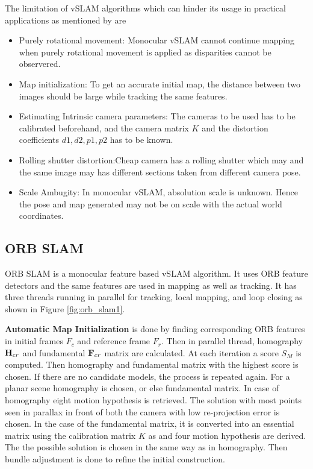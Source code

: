The limitation of vSLAM algorithms which can hinder its usage in practical applications as mentioned by  are

\begin{itemize}
	\item Purely rotational movement: Monocular vSLAM cannot continue mapping when purely rotational movement is applied as disparities cannot be observered.
	\item Map initialization: To get an accurate initial map, the distance between two images should be large while tracking the same features. 
	\item Estimating Intrinsic camera parameters: The cameras to be used has to be calibrated beforehand, and the  camera matrix $K$ and the distortion coefficients $d1, d2, p1, p2$ has to be known.
	\item Rolling shutter distortion:Cheap camera has a rolling shutter which may and the same image may has different sections taken from different camera pose.
	\item Scale Ambugity: In monocular vSLAM, absolution scale is unknown. Hence the pose and map generated may not be on scale with the actual world coordinates.
\end{itemize}




\subsection{ORB SLAM}

ORB SLAM \cite{7219438} is a monocular feature based vSLAM algorithm. It uses ORB feature detectors and the same features are used in mapping as well as tracking. It has three threads running in parallel for tracking, local mapping, and loop closing as shown in Figure \ref{fig:orb_slam1}.

\textbf{Automatic Map Initialization} is done by finding corresponding ORB features in initial frames $F_c$ and reference frame $F_r$. Then in parallel thread, homography ${\bf H}_{cr}$ and fundamental ${\bf F}_{cr}$ matrix are calculated. At each iteration a score $S_M$ is computed. Then homography and fundamental matrix with the highest score is chosen. If there are no candidate models, the process is repeated again. For a planar scene homography is chosen, or else fundamental matrix. In case of homography eight motion hypothesis is retrieved. The solution with most points seen in parallax in front of both the camera with low re-projection error is chosen. In the case of the fundamental matrix, it is converted into an essential matrix using the calibration matrix $K$ as and four motion hypothesis are derived. The the possible solution is chosen in the same way as in homography. Then bundle adjustment is done to refine the initial construction.

